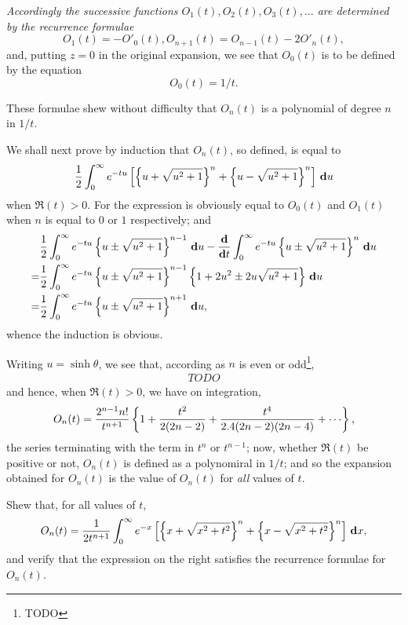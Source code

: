 \documentclass{book}
\begin{document}
%
%
\emph{Accordingly the successive functions $O_1(t), O_2(t), O_3(t),
  \ldots$ are determined by the recurrence formulae}
$$
O_1(t) = -O'_0(t),
O_{n+1}(t) = O_{n-1}(t) - 2O'_n(t),
$$
and, putting $z=0$ in the original expansion, we see that $O_0(t)$ is
to be defined by the equation
$$
O_0(t) = 1/t.
$$

These formulae shew without difficulty that $O_n(t)$ is a polynomial
of degree $n$ in $1/t$.

We shall next prove by induction that $O_n(t)$, so defined, is equal
to
$$
\frac{1}{2}
\int_0^{\infty}
e^{-tu}
\left[ 
  \left\{ u + \sqrt{u^2+1} \right\}^n
  +
  \left\{ u - \sqrt{u^2+1} \right\}^n
 \right]
\, \mathbf{d} u
$$
when $\Re(t) > 0$.
For the expression is obviously equal to $O_0(t)$ and $O_1(t)$ when
$n$ is equal to $0$ or $1$ respectively; and
\begin{align*}
  &
  \frac{1}{2}
  \int_0^{\infty}
  e^{-tu}
  \left\{ u \pm \sqrt{u^2+1} \right\}^{n-1}
  \, \mathbf{d} u
  -
  \frac{\mathbf{d}}{\mathbf{d} t}
  \int_0^{\infty}
  e^{-tu}
  \left\{ u \pm \sqrt{u^2+1} \right\}^{n}
  \, \mathbf{d} u
  \\
  =
  &  
  \frac{1}{2}
  \int_0^{\infty}
  e^{-tu}
  \left\{ u \pm \sqrt{u^2+1} \right\}^{n-1}
  \left\{ 1 + 2u^2 \pm 2u \sqrt{u^2+1} \right\}
  \, \mathbf{d} u
  \\
  =
  &
  \frac{1}{2}
  \int_0^{\infty}
  e^{-tu}
  \left\{ u \pm \sqrt{u^2+1} \right\}^{n+1}
  \, \mathbf{d} u,
\end{align*}
whence the induction is obvious.

Writing $u = \sinh \theta$, we see that, according as $n$ is even or
odd\footnote{TODO},
\begin{align*}
  TODO
\end{align*}
and hence, when $\Re(t) > 0$, we have on integration,
$$
O_n(t)
=
\frac{2^{n-1} n!}{t^{n+1}}
\thebrace{
  1
  + \frac{t^2}{2 (2n-2)}
  + \frac{t^4}{ 2.4 (2n-2)(2n-4)}
  + \cdots
},
$$
the series terminating with the term in $t^n$ or $t^{n-1}$; now,
whether $\Re(t)$ be positive or not,
$O_n(t)$ is defined as a polynomiral in $1/t$; and so the expansion
obtained for $O_n(t)$ is the value of $O_n(t)$ for \emph{all} values
of $t$.
\begin{wandwexample}
  Shew that, for all values of $t$,
  $$
  O_n(t)
  =
  \frac{1}{2 t^{n+1}}
  \int_0^{\infty}
  e^{-x}
  \left[ 
    \left\{ x + \sqrt{x^2 + t^2} \right\}^n
    +
    \left\{ x - \sqrt{x^2 + t^2} \right\}^n
   \right]
  \, \mathbf{d} x,
  $$
  and verify that the expression on the right satisfies the recurrence
  formulae for $O_n(t)$.
\end{wandwexample}
\end{document}
